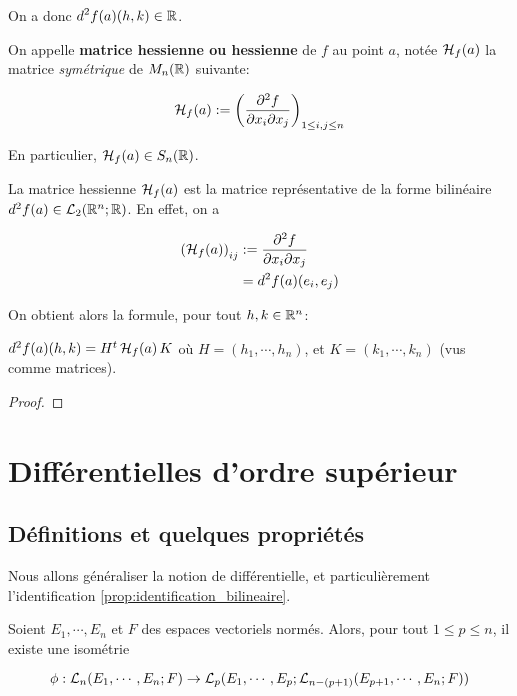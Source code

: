 On a donc $\displaystyle d^{2}f(a)(h, k) \in \real$.

\begin{definition}
	On appelle \textbf{matrice hessienne ou hessienne} de $f$ au point $a$,
	notée $\hessienneMatrix{f}{a}$ la matrice \textit{symétrique} de
	$M_{n}(\real)$ suivante:

	\begin{equation*}
		\hessienneMatrix{f}{a} := \displaystyle
		\left(\pdv{f}{x_{i}}{x_{j}} (a) \right)_{1
		\leq i, j \leq n}
	\end{equation*}

	En particulier, $\hessienneMatrix{f}{a} \in S_{n}(\real)$.
\end{definition}

La matrice hessienne $\hessienneMatrix{f}{a}$ est la matrice représentative de
la forme bilinéaire $d^{2}f (a) \in \GScontinueHomo[2]{\real^{n}}{\real}$.
En effet, on a

\begin{align*}
	\left(\hessienneMatrix{f}{a}\right)_{ij} & := \pdv{f}{x_{i}}{x_{j}} (a) \\
								& = d^{2}f (a) (e_{i}, e_{j})
\end{align*}

On obtient alors la formule, pour tout $h, k \in \real^{n}$:

\begin{proposition}
	$d^{2}f(a)(h, k) = H^{t} \, \hessienneMatrix{f}{a} \, K$
	où $H = (h_{1}, \cdots, h_{n})$, et $K = (k_{1}, \cdots, k_{n})$ (vus comme
	matrices).
\end{proposition}

\ifdefined\outputproof
\begin{proof}

\end{proof}
\fi

\section{Différentielles d'ordre supérieur}

\subsection{Définitions et quelques propriétés}

Nous allons généraliser la notion de différentielle, et particulièrement
l'identification \ref{prop:identification_bilineaire}.

\begin{proposition}
	Soient $E_{1}, \cdots, E_{n}$ et $F$ des espaces vectoriels normés.
	Alors, pour tout $1 \leq p \leq n$, il existe une isométrie

	\begin{equation*}
		\phi : \GScontinueHomo[n]{E_{1}, \cdots, E_{n}}{F} \rightarrow
		\GScontinueHomo[p]{E_{1}, \cdots, E_{p}}{\GScontinueHomo[n - (p + 1)]{E_{p + 1}, \cdots,
		E_{n}}{F}}
	\end{equation*}
\end{proposition}

